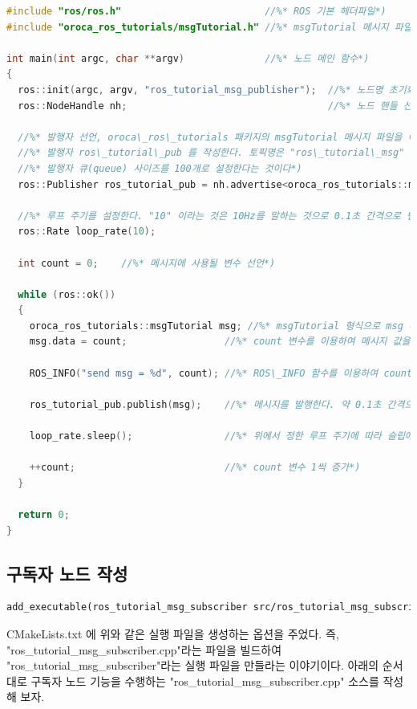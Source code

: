 \begin{lstlisting}[language=C++]
#include "ros/ros.h"                         //%* ROS 기본 헤더파일*)
#include "oroca_ros_tutorials/msgTutorial.h" //%* msgTutorial 메시지 파일헤더*)

int main(int argc, char **argv)              //%* 노드 메인 함수*)
{
  ros::init(argc, argv, "ros_tutorial_msg_publisher");  //%* 노드명 초기화*)
  ros::NodeHandle nh;                                   //%* 노드 핸들 선언*)

  //%* 발행자 선언, oroca\_ros\_tutorials 패키지의 msgTutorial 메시지 파일을 이용한*)
  //%* 발행자 ros\_tutorial\_pub 를 작성한다. 토픽명은 "ros\_tutorial\_msg" 이며,*)
  //%* 발행자 큐(queue) 사이즈를 100개로 설정한다는 것이다*)
  ros::Publisher ros_tutorial_pub = nh.advertise<oroca_ros_tutorials::msgTutorial>("ros_tutorial_msg", 100);

  //%* 루프 주기를 설정한다. "10" 이라는 것은 10Hz를 말하는 것으로 0.1초 간격으로 반복된다*)
  ros::Rate loop_rate(10); 

  int count = 0;    //%* 메시지에 사용될 변수 선언*)

  while (ros::ok())
  {
    oroca_ros_tutorials::msgTutorial msg; //%* msgTutorial 형식으로 msg 메시지를 선언*)
    msg.data = count;                 //%* count 변수를 이용하여 메시지 값을 정한다*)

    ROS_INFO("send msg = %d", count); //%* ROS\_INFO 함수를 이용하여 count 변수 표시*)

    ros_tutorial_pub.publish(msg);    //%* 메시지를 발행한다. 약 0.1초 간격으로 발행된다*)

    loop_rate.sleep();                //%* 위에서 정한 루프 주기에 따라 슬립에 들어간다*)

    ++count;                          //%* count 변수 1씩 증가*)
  }

  return 0;
}
\end{lstlisting}

\subsection{구독자 노드 작성}

\begin{lstlisting}[language=make]
add_executable(ros_tutorial_msg_subscriber src/ros_tutorial_msg_subscriber.cpp)
\end{lstlisting}

CMakeLists.txt 에 위와 같은 실행 파일을 생성하는 옵션을 주었다. 즉, "ros\_tutorial\_msg\_subscriber.cpp"라는 파일을 빌드하여 "ros\_tutorial\_msg\_subscriber"라는 실행 파일을 만들라는 이야기이다. 아래의 순서대로 구독자 노드 기능을 수행하는 "ros\_tutorial\_msg\_subscriber.cpp" 소스를 작성해 보자. 

